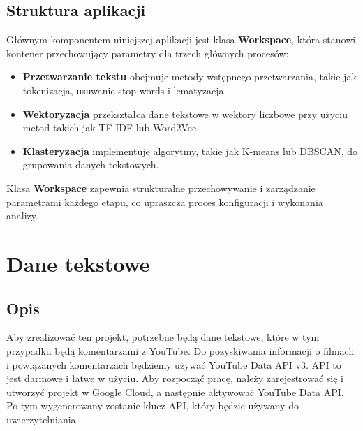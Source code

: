 		
		
	\subsection{Struktura aplikacji}
		Głównym komponentem niniejszej aplikacji jest klasa \textbf{Workspace}, która stanowi kontener przechowujący parametry dla trzech głównych procesów:
		\begin{itemize}
			\item \textbf{Przetwarzanie tekstu} obejmuje metody wstępnego przetwarzania, takie jak tokenizacja, usuwanie stop-words i lematyzacja.
			\item \textbf{Wektoryzacja} przekształca dane tekstowe w wektory liczbowe przy użyciu metod takich jak TF-IDF lub Word2Vec.
			\item \textbf{Klasteryzacja} implementuje algorytmy, takie jak K-means lub DBSCAN, do grupowania danych tekstowych.
		\end{itemize}
		Klasa \textbf{Workspace} zapewnia strukturalne przechowywanie i zarządzanie parametrami każdego etapu, co upraszcza proces konfiguracji i wykonania analizy.
		
	
\section{Dane tekstowe}

	\subsection{Opis}
		Aby zrealizować ten projekt, potrzebne będą dane tekstowe, które w tym przypadku będą komentarzami z YouTube. Do pozyskiwania informacji o filmach i powiązanych komentarzach będziemy używać YouTube Data API v3. API to jest darmowe i łatwe w użyciu. Aby rozpocząć pracę, należy zarejestrować się i utworzyć projekt w Google Cloud, a następnie aktywować YouTube Data API. Po tym wygenerowany zostanie klucz API, który będzie używany do uwierzytelniania.
		
